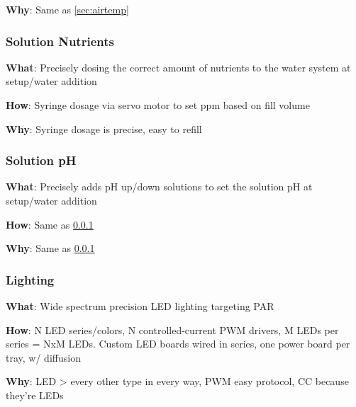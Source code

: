 \documentclass{report}
\begin{document}
\textbf{Why}: Same as \ref{sec:airtemp}

\newpage

\subsubsection{Solution Nutrients}
\label{sec:nutrients}

\textbf{What}: Precisely dosing the correct amount of nutrients to the water system at setup/water addition

\textbf{How}: Syringe dosage via servo motor to set ppm based on fill volume

\textbf{Why}: Syringe dosage is precise, easy to refill

\subsubsection{Solution pH}
\label{sec:ph}

\textbf{What}: Precisely adds pH up/down solutions to set the solution pH at setup/water addition

\textbf{How}: Same as \ref{sec:nutrients}

\textbf{Why}: Same as \ref{sec:nutrients}

\subsubsection{Lighting}
\label{sec:lighting}

\textbf{What}: Wide spectrum precision LED lighting targeting PAR

\textbf{How}: N LED series/colors, N controlled-current PWM drivers, M LEDs per series = NxM LEDs. Custom LED boards wired in series, one power board per tray, w/ diffusion

\textbf{Why}: LED > every other type in every way, PWM easy protocol, CC because they’re LEDs




% 
% 
\end{document}
